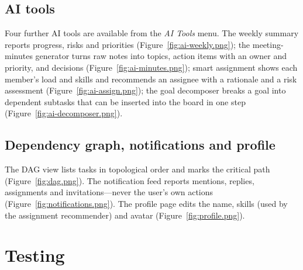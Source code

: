 \documentclass[../main.tex]{subfiles}
\begin{document}

\subsection{AI tools}
Four further AI tools are available from the \emph{AI Tools} menu. The weekly summary reports
progress, risks and priorities (Figure~\ref{fig:ai-weekly.png}); the meeting-minutes generator
turns raw notes into topics, action items with an owner and priority, and decisions
(Figure~\ref{fig:ai-minutes.png}); smart assignment shows each member's load and skills and
recommends an assignee with a rationale and a risk assessment (Figure~\ref{fig:ai-assign.png}); the
goal decomposer breaks a goal into dependent subtasks that can be inserted into the board in one
step (Figure~\ref{fig:ai-decomposer.png}).


\subsection{Dependency graph, notifications and profile}
The DAG view lists tasks in topological order and marks the critical path
(Figure~\ref{fig:dag.png}). The notification feed reports mentions, replies, assignments and
invitations---never the user's own actions (Figure~\ref{fig:notifications.png}). The profile page
edits the name, skills (used by the assignment recommender) and avatar (Figure~\ref{fig:profile.png}).


\section{Testing}
\end{document}
